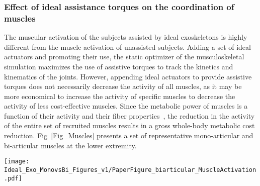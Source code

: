 \documentclass[10pt,letterpaper]{article}
\begin{document}
\subsubsection*{Effect of ideal assistance torques on the coordination of muscles}

The muscular activation of the subjects assisted by ideal exoskeletons is highly different from the muscle activation of unassisted subjects. Adding a set of ideal actuators and promoting their use, the static optimizer of the musculoskeletal simulation maximizes the use of assistive torques to track the kinetics and kinematics of the joints. However, appending ideal actuators to provide assistive torques does not necessarily decrease the activity of all muscles, as it may be more economical to increase the activity of specific muscles  to decrease the activity of less cost-effective muscles. Since the metabolic power of muscles is a function of their activity and their fiber properties~\cite{Uchida2016_metabolic_model}, the reduction in the activity of the entire set of recruited muscles results in a gross whole-body metabolic cost reduction.  Fig~\ref{Fig_Muscles} presents a set of representative mono-articular and bi-articular muscles at the lower extremity.

\begin{figure*}[ht!]
	\centering
	\hfil
	\caption{\small{\textbf{Representative of bi-articular and mono-articular lower extremity muscles}}}
	\label{Fig_Muscles}
\end{figure*} %


\begin{figure*}[ht]
	\centering
	\texttt{[image: Ideal\_Exo\_MonovsBi\_Figures\_v1/PaperFigure\_biarticular\_MuscleActivation.pdf]}
	\vspace{-3mm}
	\caption{{\small\textbf{Activation of representative lower limb muscles of assisted and unassisted subjects.} The activation of unassisted subjects under \emph{noload} (green) and \emph{loaded} (black) walking conditions, and assisted subjects under \textit{noload} (pink) and \textit{loaded} (dark violet) walking conditions are shown for nine important muscles. The curves are averaged over 7 subjects with 3 trials.}}
	\label{Fig_IdealExo_MusclesActivation}
\end{figure*}%
\end{document}

